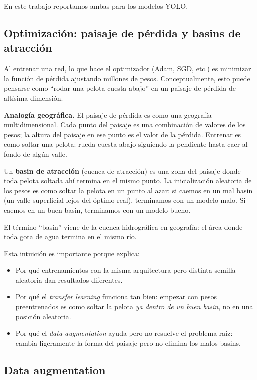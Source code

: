 \documentclass[a4paper,11pt]{article}
\begin{document}
En este trabajo reportamos ambas para los modelos YOLO.

\subsection{Optimización: paisaje de pérdida y basins de atracción}
\label{sec:basins}

Al entrenar una red, lo que hace el optimizador (Adam, SGD, etc.) es minimizar la función de pérdida ajustando millones de pesos. Conceptualmente, esto puede pensarse como ``rodar una pelota cuesta abajo'' en un paisaje de pérdida de altísima dimensión.

\begin{concepto}
\textbf{Analogía geográfica.} El paisaje de pérdida es como una geografía multidimensional. Cada punto del paisaje es una combinación de valores de los pesos; la altura del paisaje en ese punto es el valor de la pérdida. Entrenar es como soltar una pelota: rueda cuesta abajo siguiendo la pendiente hasta caer al fondo de algún valle.

Un \textbf{basin de atracción} (cuenca de atracción) es una zona del paisaje donde toda pelota soltada ahí termina en el mismo punto. La inicialización aleatoria de los pesos es como soltar la pelota en un punto al azar: si caemos en un mal basin (un valle superficial lejos del óptimo real), terminamos con un modelo malo. Si caemos en un buen basin, terminamos con un modelo bueno.

El término ``basin'' viene de la cuenca hidrográfica en geografía: el área donde toda gota de agua termina en el mismo río.
\end{concepto}

Esta intuición es importante porque explica:
\begin{itemize}[itemsep=2pt]
    \item Por qué entrenamientos con la misma arquitectura pero distinta semilla aleatoria dan resultados diferentes.
    \item Por qué el \textit{transfer learning} funciona tan bien: empezar con pesos preentrenados es como soltar la pelota \emph{ya dentro de un buen basin}, no en una posición aleatoria.
    \item Por qué el \textit{data augmentation} ayuda pero no resuelve el problema raíz: cambia ligeramente la forma del paisaje pero no elimina los malos basins.
\end{itemize}

\subsection{Data augmentation}
\end{document}
